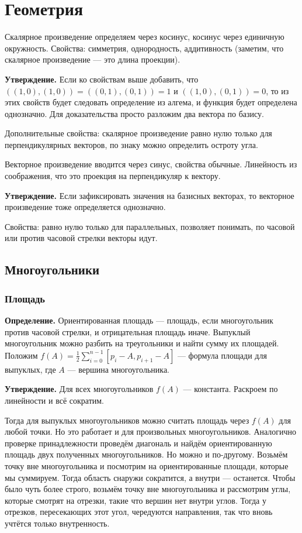 \section{Геометрия}
Скалярное произведение определяем через косинус, косинус через единичную окружность.
Свойства: симметрия, однородность, аддитивность (заметим, что скалярное произведение --- это длина проекции).

\textbf{Утверждение.} Если ко свойствам выше добавить, что $((1, 0), (1, 0)) = ((0, 1), (0, 1)) = 1$ и $((1, 0), (0, 1)) = 0$, то из этих свойств будет следовать определение из алгема, и функция будет определена однозначно.
Для доказательства просто разложим два вектора по базису.

Дополнительные свойства: скалярное произведение равно нулю только для перпендикулярных векторов, по знаку можно определить остроту угла.

Векторное произведение вводится через синус, свойства обычные.
Линейность из соображения, что это проекция на перпендикуляр к вектору.

\textbf{Утверждение.} Если зафиксировать значения на базисных векторах, то векторное произведение тоже определяется однозначно.

Свойства: равно нулю только для параллельных, позволяет понимать, по часовой или против часовой стрелки векторы идут.

\subsection{Многоугольники}
\subsubsection{Площадь}
\textbf{Определение.} Ориентированная площадь --- площадь, если многоугольник против часовой стрелки, и отрицательная площадь иначе.
Выпуклый многоугольник можно разбить на треугольники и найти сумму их площадей.
Положим $f(A) = \frac{1}{2} \sum_{i=0}^{n-1} [p_i - A, p_{i+1} - A]$ --- формула площади для выпуклых, где $A$ --- вершина многоугольника.

\textbf{Утверждение.} Для всех многоугольников $f(A)$ --- константа.
Раскроем по линейности и всё сократим.

Тогда для выпуклых многоугольников можно считать площадь через $f(A)$ для любой точки.
Но это работает и для произвольных многоугольников.
Аналогично проверке принадлежности проведём диагональ и найдём ориентированную площадь двух полученных многоугольников.
Но можно и по-другому.
Возьмём точку вне многоугольника и посмотрим на ориентированные площади, которые мы суммируем.
Тогда область снаружи сократится, а внутри --- останется.
Чтобы было чуть более строго, возьмём точку вне многоугольника и рассмотрим углы, которые смотрят на отрезки, такие что вершин нет внутри углов.
Тогда у отрезков, пересекающих этот угол, чередуются направления, так что вновь учтётся только внутренность.

